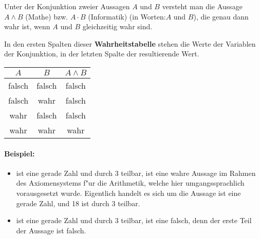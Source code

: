 \begin{definition}[Konjunktion]
Unter der Konjunktion zweier Aussagen $A$ und $B$ versteht man die Aussage $A \land B$ (Mathe) bzw. $A \cdot B$ (Informatik) (in Worten:\glqq $A$ und $B$\grqq ), die genau dann wahr ist, wenn $A$ und $B$ gleichzeitig wahr sind.
\end{definition}
In den ersten Spalten dieser \textbf{Wahrheitstabelle} stehen die Werte der Variablen der Konjunktion, in der letzten Spalte der resultierende Wert.
\begin{center}
\begin{tabular}{c|c||c}
 $A$& $B$  &  $A \land B$  \\ 
\hline
\cellcolor{ared} falsch & \cellcolor{ared} falsch & \cellcolor{ared} falsch   \\ 
\cellcolor{ared} falsch & \cellcolor{agreen} wahr & \cellcolor{ared} falsch  \\ 
\cellcolor{agreen} wahr & \cellcolor{ared} falsch & \cellcolor{ared} falsch   \\ 
\cellcolor{agreen} wahr & \cellcolor{agreen} wahr & \cellcolor{agreen} wahr  \\ 
\hline
\end{tabular}
\end{center}

\paragraph*{Beispiel:}
\begin{itemize}
	\item {} ist eine gerade Zahl und durch 3 teilbar\grqq , ist eine wahre Aussage im Rahmen des Axiomensystems f"ur die Arithmetik, welche hier umgangssprachlich vorausgesetzt wurde. Eigentlich handelt es sich um die Aussage  ist eine gerade Zahl, und 18 ist durch 3 teilbar\grqq .
	\item {} ist eine gerade Zahl und durch 3 teilbar\grqq, ist eine falsch, denn der erste Teil der Aussage ist falsch.
\end{itemize}

